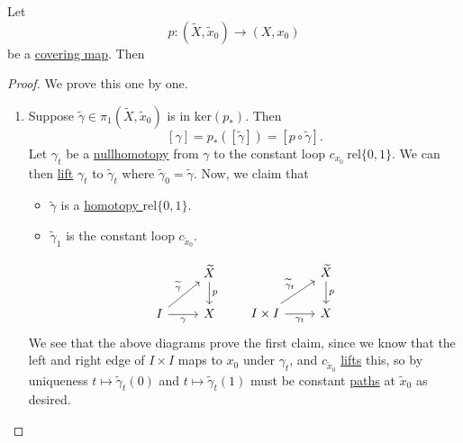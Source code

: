 \begin{proposition}
	Let
	\[
		p\colon (\widetilde{X} , \widetilde{x} _0)\to (X, x_0)
	\]
	be a \hyperref[def:covering-map]{covering map}. Then
\end{proposition}
\begin{proof}
	We prove this one by one.
	\begin{enumerate}
		\item Suppose \(\widetilde{\gamma} \in \pi _1(\widetilde{X} , \widetilde{x} _0)\) is in \(\mathrm{ker}(p_*) \). Then
		      \[
			      [\gamma] =p_*([\widetilde{\gamma} ]) = \left[p \circ \widetilde{\gamma} \right].
		      \]
		      Let \(\gamma _{t}\) be a \hyperref[def:nullhomotopic]{nullhomotopy} from \(\gamma \) to the constant loop \(c_{x_0}\ \mathrm{rel} \{0, 1\}\).
		      We can then \hyperref[prop:homotopy-lifting-property]{lift} \(\gamma _{t}\) to \(\widetilde{\gamma} _{t}\) where \(\widetilde{\gamma} _0 = \widetilde{\gamma} \).
		      Now, we claim that
		      \begin{itemize}
			      \item \(\widetilde{\gamma} \) is a \hyperref[def:homotopy-relative]{homotopy \(\mathrm{rel} \{0, 1\}\)}.
			      \item \(\widetilde{\gamma} _1\) is the constant loop \(c_{\widetilde{x} _0}\).
		      \end{itemize}
		      \[
			      \begin{tikzcd}
				      & {\widetilde{X}} \\
				      I & X
				      \arrow["{\widetilde{\gamma}}", from=2-1, to=1-2]
				      \arrow["p", from=1-2, to=2-2]
				      \arrow["\gamma"', from=2-1, to=2-2]
			      \end{tikzcd}\qquad
			      \begin{tikzcd}
				      & {\widetilde{X}} \\
				      {I\times I} & X
				      \arrow["{\widetilde{\gamma}_t}", from=2-1, to=1-2]
				      \arrow["p", from=1-2, to=2-2]
				      \arrow["{\gamma_t}"', from=2-1, to=2-2]
			      \end{tikzcd}
		      \]
		      We see that the above diagrams prove the first claim, since we know that the left and right edge of \(I\times I\) maps to \(x_0\) under
		      \(\gamma _{t}\), and \(c_{\widetilde{x} _0}\) \hyperref[prop:homotopy-lifting-property]{lifts} this, so by uniqueness \(t\mapsto \widetilde{\gamma} _t(0)\) and
		      \(t\mapsto \widetilde{\gamma} _{t}(1)\) must be constant \hyperref[def:path]{paths} at \(\widetilde{x} _0\) as desired.


\end{enumerate}
\end{proof}
